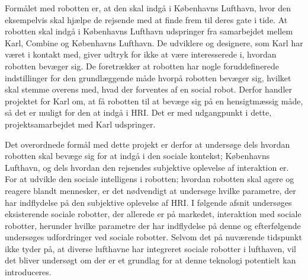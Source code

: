 \noindent
%
Formålet med robotten er, at den skal indgå i Københavns Lufthavn, hvor den eksempelvis skal hjælpe de rejsende med at finde frem til deres gate i tide. At robotten skal indgå i Københavns Lufthavn udspringer fra samarbejdet mellem Karl, Combine og Københavns Lufthavn. De udviklere og designere, som Karl har været i kontakt med, giver udtryk for ikke at være interesserede i, hvordan robotten bevæger sig. De foretrækker at robotten har nogle foruddefinerede indstillinger for den grundlæggende måde hvorpå robotten bevæger sig, hvilket skal stemme overens med, hvad der forventes af en social robot. Derfor handler projektet for Karl om, at få robotten til at bevæge sig på en hensigtmæssig måde, så det er muligt for den at indgå i HRI. Det er med udgangpunkt i dette, projektsamarbejdet med Karl udspringer. 

Det overordnede formål med dette projekt er derfor at undersøge dels hvordan robotten skal bevæge sig for at indgå i den sociale kontekst; Københavns Lufthavn, og dels hvordan den rejsendes subjektive oplevelse af interaktion er.\blankline
%  
For at udvikle den sociale intelligens i robotten; hvordan robotten skal agere og reagere blandt mennesker, er det nødvendigt at undersøge hvilke parametre, der har indflydelse på den subjektive oplevelse af HRI. I følgende afsnit undersøges eksisterende sociale robotter, der allerede er på markedet, interaktion med sociale robotter, herunder hvilke parametre der har indflydelse på denne og efterfølgende undersøges udfordringer ved sociale robotter. Selvom det på nuværende tidspunkt ikke tyder på, at diverse lufthavne har integreret sociale robotter i lufthaven, vil det bliver undersøgt om der er et grundlag for at denne teknologi potentielt kan introduceres. 

